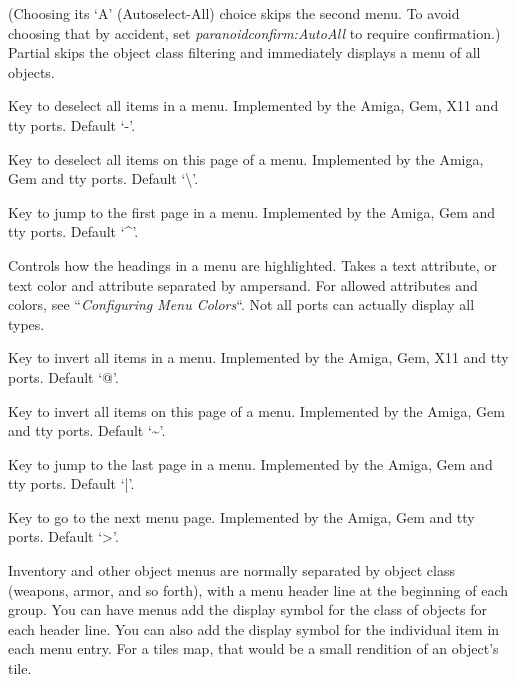 \documentclass[titlepage]{article}
\begin{document}
\begin{description}[font=\mdseries\itshape]
(Choosing its `A' (Autoselect-All) choice skips the second menu.
To avoid choosing that by accident,
set \textit{paranoid\textunderscore confirm:AutoAll} to require confirmation.)
Partial skips the object class filtering and
immediately displays a menu of all objects.
\item[menu\textunderscore deselect\textunderscore all]
Key to deselect all items in a menu.
Implemented by the Amiga, Gem, X11 and tty ports.
Default `-'.
\item[menu\textunderscore deselect\textunderscore page]
Key to deselect all items on this page of a menu.
Implemented by the Amiga, Gem and tty ports.
Default `\textbackslash'.
\item[menu\textunderscore first\textunderscore page]
Key to jump to the first page in a menu.
Implemented by the Amiga, Gem and tty ports.
Default `\textasciicircum'.
\item[menu\textunderscore headings]
Controls how the headings in a menu are highlighted.
Takes a text attribute, or text color and attribute separated by ampersand.
For allowed attributes and colors, see ``\textit{Configuring Menu Colors}``.
Not all ports can actually display all types.
\item[menu\textunderscore invert\textunderscore all]
Key to invert all items in a menu.
Implemented by the Amiga, Gem, X11 and tty ports.
Default `@'.
\item[menu\textunderscore invert\textunderscore page]
Key to invert all items on this page of a menu.
Implemented by the Amiga, Gem and tty ports.
Default `\textasciitilde'.
\item[menu\textunderscore last\textunderscore page]
Key to jump to the last page in a menu.
Implemented by the Amiga, Gem and tty ports.
Default `|'.
\item[menu\textunderscore next\textunderscore page]
Key to go to the next menu page.
Implemented by the Amiga, Gem and tty ports.
Default `>'.
\item[menu\textunderscore objsyms]
Inventory and other object menus are normally separated by object class
(weapons, armor, and so forth), with a menu header line at the beginning
of each group.
You can have menus add the display symbol for the class of objects for
each header line.
You can also add the display symbol for the individual item in each menu
entry.
For a tiles map, that would be a small rendition of an object's tile.

\end{description}
\end{document}
